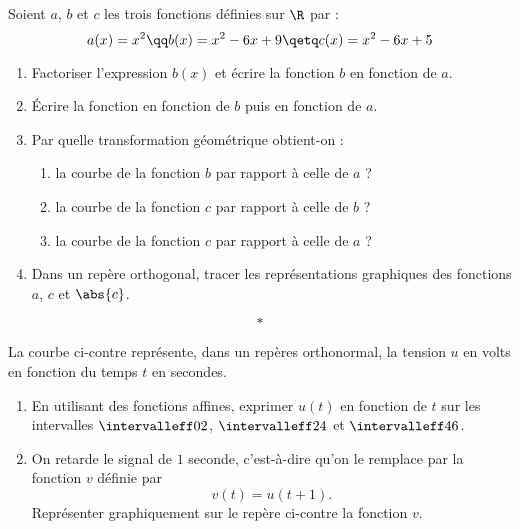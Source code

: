 \documentclass[10pt,openright,twoside,french]{book}
\begin{document}
\exo
Soient $a$, $b$ et $c$ les trois fonctions définies sur $\R$ par :
    \[a(x) = x^2 \qq b(x) = x^2 - 6x + 9 \qetq c(x) = x^2 - 6x + 5\]
\begin{enumerate}
    \item Factoriser l'expression $b(x)$ et écrire la fonction $b$ en fonction de $a$.
    \item \'Ecrire la fonction en fonction de $b$ puis en fonction de $a$.
    \item Par quelle transformation géométrique obtient-on :
        \begin{enumerate}
            \item la courbe de la fonction $b$ par rapport à celle de $a$ ?
            \item la courbe de la fonction $c$ par rapport à celle de $b$ ?
            \item la courbe de la fonction $c$ par rapport à celle de $a$ ?
        \end{enumerate}
    \item Dans un repère orthogonal, tracer les représentations graphiques des fonctions $a$, $c$ et $\abs{c}$.
\end{enumerate}\[*\]

\exo
\begin{minipage}{0.4\linewidth}
La courbe ci-contre représente, dans un repères orthonormal, la tension $u$ en volts en fonction du temps $t$ en secondes.
\begin{enumerate}
    \item En utilisant des fonctions affines, exprimer $u(t)$ en fonction de $t$ sur les intervalles $\intervalleff 0 2$, $\intervalleff 2 4$ et $\intervalleff 4 6$.
    \item On retarde le signal de $1$ seconde, c'est-à-dire qu'on le remplace par la fonction $v$ définie par \[v(t) = u(t + 1).\]
    Représenter graphiquement sur le repère ci-contre la fonction $v$.
\end{enumerate}
\end{minipage}\hfill\begin{minipage}{0.6\linewidth}
\begin{center}
\end{center}
\end{minipage}
\end{document}
